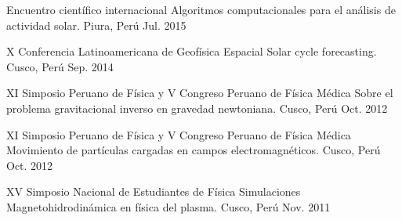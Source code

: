 \begin{cventries}
  \cventry
    {Encuentro científico internacional} %
    {Algoritmos computacionales para el análisis de actividad solar.} %
    {Piura, Perú} %
    {Jul. 2015} %
    {}

  \cventry
    {X Conferencia Latinoamericana de Geofísica Espacial} %
    {Solar cycle forecasting.} %
    {Cusco, Perú} %
    {Sep. 2014} %
    {}

  \cventry
    {XI Simposio Peruano de Física y V Congreso Peruano de Física Médica} %
    {Sobre el problema gravitacional inverso en gravedad newtoniana.} %
    {Cusco, Perú} %
    {Oct. 2012} %
    {}

  \cventry
    {XI Simposio Peruano de Física y V Congreso Peruano de Física Médica} %
    {Movimiento de partículas cargadas en campos electromagnéticos.} %
    {Cusco, Perú} %
    {Oct. 2012} %
    {}

  \cventry
    {XV Simposio Nacional de Estudiantes de Física} %
    {Simulaciones Magnetohidrodinámica en física del plasma.} %
    {Cusco, Perú} %
    {Nov. 2011} %
    {}

\end{cventries}
